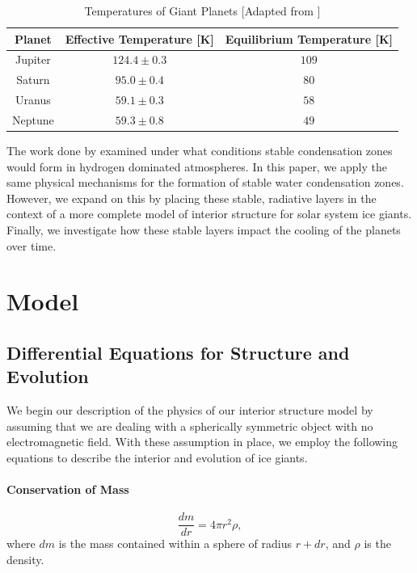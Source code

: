 \documentclass[11pt]{ucscthesisbs}
\begin{document}
\begin{table}[]
\centering
\begin{tabular}{ccc}
Planet                        & Effective Temperature [K]            & Equilibrium Temperature [K] \\ \hline
\multicolumn{1}{|c|}{Jupiter} & \multicolumn{1}{c|}{$124.4 \pm 0.3$} & \multicolumn{1}{c|}{$109$}  \\ \hline
\multicolumn{1}{|c|}{Saturn}  & \multicolumn{1}{c|}{$95.0 \pm 0.4$}  & \multicolumn{1}{c|}{$80$}   \\ \hline
\multicolumn{1}{|c|}{Uranus}  & \multicolumn{1}{c|}{$59.1 \pm 0.3$}  & \multicolumn{1}{c|}{$58$}   \\ \hline
\multicolumn{1}{|c|}{Neptune} & \multicolumn{1}{c|}{$59.3 \pm 0.8$}  & \multicolumn{1}{c|}{$49$}   \\ \hline
\end{tabular}
\caption{Temperatures of Giant Planets [Adapted from \citep{seager_2010}]}
\label{tab:planetary_temperatures}
\end{table}


The work done by \citep{guillot_1995,friedson_2017,leconte_2017} examined under what conditions stable condensation zones would form in hydrogen dominated atmospheres. In this paper, we apply the same physical mechanisms for the formation of stable water condensation zones. However, we expand on this by placing these stable, radiative layers in the context of a more complete model of interior structure for solar system ice giants. Finally, we investigate how these stable layers impact the cooling of the planets over time. 


\chapter{Model}

\section{Differential Equations for Structure and Evolution}
\label{Three-layer Model with Dry Adiabat}
We begin our description of the physics of our interior structure model by assuming that we are dealing with a spherically symmetric object with no electromagnetic field.  With these assumption in place, we employ the following equations to describe the interior and evolution of ice giants.
\subsubsection{Conservation of Mass}
\begin{equation}
  \frac{dm}{dr} =4 \pi r^{2}\rho  ,
\end{equation}
where $dm$ is the mass contained within a sphere of radius $r + dr$, and $\rho$ is the density. 
\end{document}
